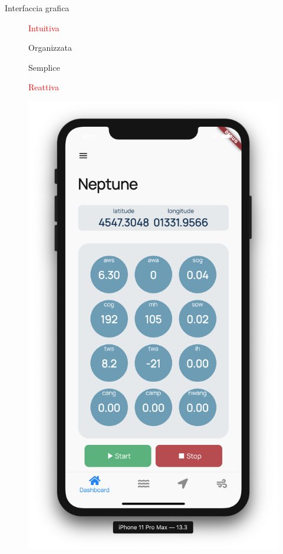 \documentclass[12pt,italian,oneside]{report}
\newcommand{\rosso}[1]{\textcolor{red}{#1}}
\begin{document}
\newpage

\begin{firstheadlineitemize}

\item Interfaccia grafica

\begin{figure}[htp]
	\centering
	\hfill
	\begin{minipage}[c]{.3\columnwidth}
		\centering
	  	\begin{secondheadlineitemize}
			\item \rosso{Intuitiva}
			\item Organizzata
			\item Semplice
			\item \rosso{Reattiva}
		\end{secondheadlineitemize}
	\end{minipage}
	\begin{minipage}[c]{.5\columnwidth}
		\includegraphics[scale=0.31]{dashboard}

\end{minipage}
\end{figure}
\end{firstheadlineitemize}
\end{document}
